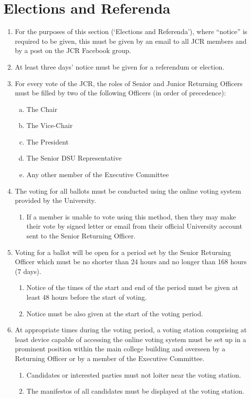 \documentclass[12pt]{article}  %
\begin{document}
\section{Elections and Referenda}
\begin{enumerate}
    \item For the purposes of this section (‘Elections and Referenda’), where “notice” is required to be given, this must be given by an email to all JCR members and by a post on the JCR Facebook group.
    \item At least three days’ notice must be given for a referendum or election.
    \item For every vote of the JCR, the roles of Senior and Junior Returning Officers must be filled by two of the following Officers (in order of precedence):
    \begin{enumerate}[(a)]
        \item The Chair
        \item The Vice-Chair
        \item The President
        \item The Senior DSU Representative
        \item Any other member of the Executive Committee
    \end{enumerate}
    \item The voting for all ballots must be conducted using the online voting system provided by the University.
    \begin{enumerate}
        \item If a member is unable to vote using this method, then they may make their vote by signed letter or email from their official University account sent to the Senior Returning Officer. 
    \end{enumerate}
    \item Voting for a ballot will be open for a period set by the Senior Returning Officer which must be no shorter than 24 hours and no longer than 168 hours (7 days).
    \begin{enumerate}
        \item Notice of the times of the start and end of the period must be given at least 48 hours before the start of voting.
        \item Notice must be also given at the start of the voting period.
    \end{enumerate}
    \item At appropriate times during the voting period, a voting station comprising at least device capable of accessing the online voting system must be set up in a prominent position within the main college building and overseen by a Returning Officer or by a member of the Executive Committee.
    \begin{enumerate}
        \item Candidates or interested parties must not loiter near the voting station.
        \item The manifestos of all candidates must be displayed at the voting station.
    \end{enumerate}

\end{enumerate}
\end{document}
